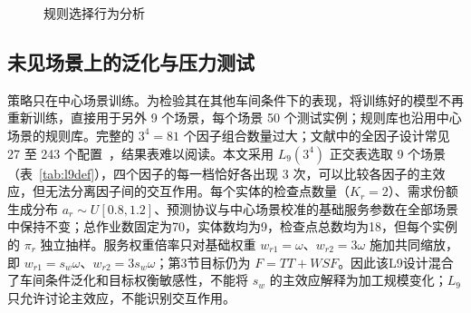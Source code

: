 \begin{figure}[t]
  \centering
  \caption{规则选择行为分析}\label{fig:behavior}
\end{figure}


\subsection{未见场景上的泛化与压力测试}

策略只在中心场景训练。为检验其在其他车间条件下的表现，将训练好的模型不再重新训练，直接用于另外 9 个场景，每个场景 50 个测试实例；规则库也沿用中心场景的规则库。完整的 $3^4=81$ 个因子组合数量过大；文献中的全因子设计常见 27 至 243 个配置~\cite{zheng2025,lei2024}，结果表难以阅读。本文采用 $L_9(3^4)$ 正交表选取 9 个场景（表~\ref{tab:l9def}），四个因子的每一档恰好各出现 3 次，可以比较各因子的主效应，但无法分离因子间的交互作用。每个实体的检查点数量（$K_r=2$）、需求份额生成分布 $a_r\sim U[0.8,1.2]$、预测协议与中心场景校准的基础服务参数在全部场景中保持不变；总作业数固定为70，实体数均为9，检查点总数均为18，但每个实例的 $\pi_r$ 独立抽样。服务权重倍率只对基础权重 $w_{r1}=\omega$、$w_{r2}=3\omega$ 施加共同缩放，即 $w_{r1}=s_w\omega$、$w_{r2}=3s_w\omega$；第3节目标仍为 $F=TT+WSF$。因此该L9设计混合了车间条件泛化和目标权衡敏感性，不能将 $s_w$ 的主效应解释为加工规模变化；$L_9$ 只允许讨论主效应，不能识别交互作用。

